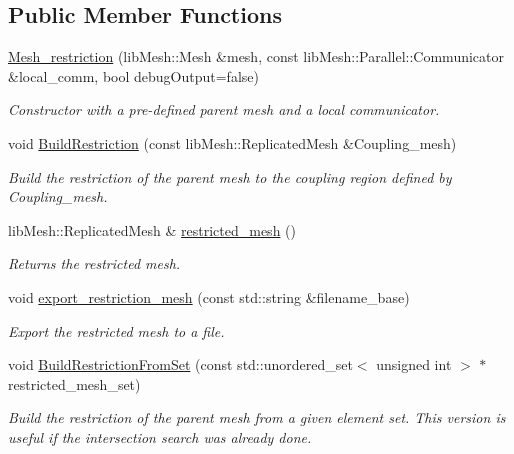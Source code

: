 \subsection*{Public Member Functions}
\begin{DoxyCompactItemize}
\item 
\hyperlink{classcarl_1_1_mesh__restriction_a8999a74445ddd927a357725137444286}{Mesh\+\_\+restriction} (lib\+Mesh\+::\+Mesh \&mesh, const lib\+Mesh\+::\+Parallel\+::\+Communicator \&local\+\_\+comm, bool debug\+Output=false)
\begin{DoxyCompactList}\small\item\em Constructor with a pre-\/defined parent mesh and a local communicator. \end{DoxyCompactList}\item 
void \hyperlink{classcarl_1_1_mesh__restriction_adce7d5a94e5e65f5bee4145eb25ebd61}{Build\+Restriction} (const lib\+Mesh\+::\+Replicated\+Mesh \&Coupling\+\_\+mesh)
\begin{DoxyCompactList}\small\item\em Build the restriction of the parent mesh to the coupling region defined by Coupling\+\_\+mesh. \end{DoxyCompactList}\item 
lib\+Mesh\+::\+Replicated\+Mesh \& \hyperlink{classcarl_1_1_mesh__restriction_a1313c9ef12044e000a03b35b379b56bc}{restricted\+\_\+mesh} ()
\begin{DoxyCompactList}\small\item\em Returns the restricted mesh. \end{DoxyCompactList}\item 
void \hyperlink{classcarl_1_1_mesh__restriction_aacd0d990d392ea65c027974d380bbc26}{export\+\_\+restriction\+\_\+mesh} (const std\+::string \&filename\+\_\+base)
\begin{DoxyCompactList}\small\item\em Export the restricted mesh to a file. \end{DoxyCompactList}\item 
void \hyperlink{classcarl_1_1_mesh__restriction_ab2253edf0b64fd412503b021da24f66d}{Build\+Restriction\+From\+Set} (const std\+::unordered\+\_\+set$<$ unsigned int $>$ $\ast$restricted\+\_\+mesh\+\_\+set)
\begin{DoxyCompactList}\small\item\em Build the restriction of the parent mesh from a given element set. This version is useful if the intersection search was already done. \end{DoxyCompactList}\end{DoxyCompactItemize}

